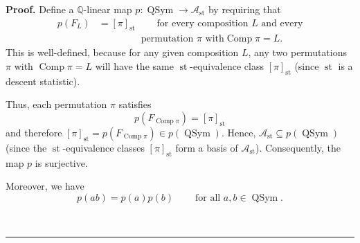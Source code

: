 \documentclass[numbers=enddot,12pt,final,onecolumn,notitlepage]{scrartcl}%
\theoremstyle{definition}
\newenvironment{proof}[1][Proof]{\noindent\textbf{#1.} }{\ \rule{0.5em}{0.5em}}
\newenvironment{verlong}{}{}
\begin{document}
\begin{verlong}
\begin{proof}
Define a $\mathbb{Q}$-linear map $p:\operatorname*{QSym}\rightarrow
\mathcal{A}_{\operatorname{st}}$ by requiring that%
\begin{align*}
p\left(  F_{L}\right)   &  =\left[  \pi\right]  _{\operatorname{st}}
\ \ \ \ \ \ \ \ \ \ \text{for every composition }L\text{ and every}\\
&  \ \ \ \ \ \ \ \ \ \ \ \ \ \ \ \ \ \ \ \ \text{permutation }\pi\text{ with
}\operatorname*{Comp}\pi=L.
\end{align*}
This is well-defined, because for any given composition $L$, any two
permutations $\pi$ with $\operatorname*{Comp}\pi=L$ will have the same
$\operatorname{st}$-equivalence class $\left[  \pi\right]
_{\operatorname{st}}$ (since $\operatorname{st}$ is a descent statistic).

Thus, each permutation $\pi$ satisfies
\begin{equation}
p\left(  F_{\operatorname*{Comp}\pi}\right)  =\left[  \pi\right]
_{\operatorname{st}} \label{pf.prop.Ast.alg.pFCp}%
\end{equation}
and therefore $\left[  \pi\right]  _{\operatorname{st}}=p\left(
F_{\operatorname*{Comp}\pi}\right)  \in p\left(  \operatorname*{QSym}\right)
$. Hence, $\mathcal{A}_{\operatorname{st}}\subseteq p\left(
\operatorname*{QSym}\right)  $ (since the $\operatorname{st}$-equivalence
classes $\left[  \pi\right]  _{\operatorname{st}}$ form a basis of
$\mathcal{A}_{\operatorname{st}}$). Consequently, the map $p$ is surjective.

Moreover, we have%
\begin{equation}
p\left(  ab\right)  =p\left(  a\right)  p\left(  b\right)
\ \ \ \ \ \ \ \ \ \ \text{for all }a,b\in\operatorname*{QSym}.
\label{pf.prop.Ast.alg.pab}%
\end{equation}



\end{proof}
\end{verlong}
\end{document}
